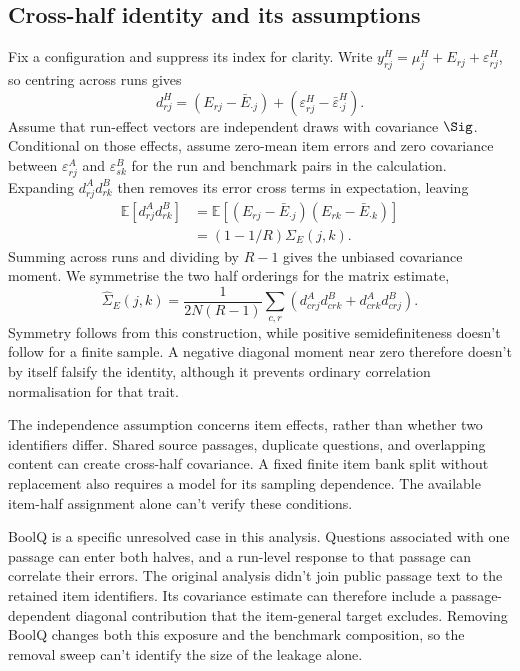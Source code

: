 \subsection{Cross-half identity and its assumptions}
Fix a configuration and suppress its index for clarity. Write $y^H_{rj}=\mu^H_j+E_{rj}+\varepsilon^H_{rj}$, so centring across runs gives
\begin{equation}
d^H_{rj}=(E_{rj}-\bar E_{\cdot j})+(\varepsilon^H_{rj}-\bar\varepsilon^H_{\cdot j}).
\end{equation}
Assume that run-effect vectors are independent draws with covariance $\Sig$. Conditional on those effects, assume zero-mean item errors and zero covariance between $\varepsilon^A_{rj}$ and $\varepsilon^B_{sk}$ for the run and benchmark pairs in the calculation. Expanding $d^A_{rj}d^B_{rk}$ then removes its error cross terms in expectation, leaving
\begin{align}
\mathbb E[d^A_{rj}d^B_{rk}]
&=\mathbb E[(E_{rj}-\bar E_{\cdot j})(E_{rk}-\bar E_{\cdot k})]\\
&=(1-1/R)\Sigma_E(j,k).
\end{align}
Summing across runs and dividing by $R-1$ gives the unbiased covariance moment. We symmetrise the two half orderings for the matrix estimate,
\begin{equation}
\widehat\Sigma_E(j,k)=\frac{1}{2N(R-1)}\sum_{c,r}
\left(d^A_{crj}d^B_{crk}+d^A_{crk}d^B_{crj}\right).
\end{equation}
Symmetry follows from this construction, while positive semidefiniteness doesn't follow for a finite sample. A negative diagonal moment near zero therefore doesn't by itself falsify the identity, although it prevents ordinary correlation normalisation for that trait.

The independence assumption concerns item effects, rather than whether two identifiers differ. Shared source passages, duplicate questions, and overlapping content can create cross-half covariance. A fixed finite item bank split without replacement also requires a model for its sampling dependence. The available item-half assignment alone can't verify these conditions.

BoolQ is a specific unresolved case in this analysis. Questions associated with one passage can enter both halves, and a run-level response to that passage can correlate their errors. The original analysis didn't join public passage text to the retained item identifiers. Its covariance estimate can therefore include a passage-dependent diagonal contribution that the item-general target excludes. Removing BoolQ changes both this exposure and the benchmark composition, so the removal sweep can't identify the size of the leakage alone.

